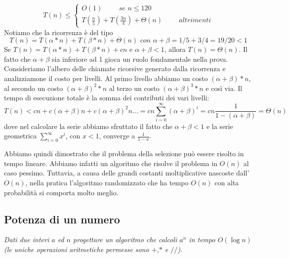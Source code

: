 $$T(n)\leq\begin{cases}
        O(1)\hspace{1cm}\textit{se }n\leq120\\
        T\left(\frac{n}{5}\right)+T\left(\frac{3n}{4}\right)+\Theta(n)\hspace{1cm}\textit{altrimenti}
\end{cases}$$
Notiamo che la ricorrenza è del tipo
\begin{equation*}
    T(n) = T(\alpha * n) + T(\beta * n) + \Theta(n) \textit{ con } \alpha + \beta = 1/5+3/4 = 19/20 < 1
\end{equation*}
Se $T(n) = T(\alpha * n) + T(\beta * n) + cn$ e $\alpha+\beta<1$, allora $T(n)=\Theta(n)$.
Il fatto che $\alpha+\beta$ sia inferiore ad 1 gioca un ruolo fondamentale nella prova. Consideriamo l'albero delle chiamate ricorsive generato dalla ricorrenza e analizziamone il costo per livelli. 
Al primo livello abbiamo un costo $(\alpha+\beta)*n$, al secondo un costo $(\alpha+\beta)^2*n$
al terzo un costo $(\alpha+\beta)^3*n$ e così via. 
Il tempo di esecuzione totale è la somma dei contributi dei vari livelli:
\begin{equation*}
    T(n) < cn+c(\alpha+\beta)n+c(\alpha+\beta)^2n...=cn\sum^\infty_{i=0}(\alpha+\beta)^i=cn\frac{1}{1-(\alpha+\beta)}=\Theta(n)
\end{equation*}
dove nel calcolare la serie abbiamo sfruttato il fatto che $\alpha+\beta<1$ e la serie geometrica $\sum^\infty_{i=0}x^i$, con $x < 1$, converge a $\frac{1}{1-x}$.

Abbiamo quindi dimostrato che il problema della selezione può essere risolto in tempo lineare.
Abbiamo infatti un algoritmo che risolve il problema in $O(n)$ al caso pessimo. Tuttavia, a causa delle grandi costanti moltiplicative nascoste dall'$O(n)$, nella pratica l'algoritmo randomizzato che ha tempo $O(n)$ con alta probabilità si comporta molto meglio.

\subsection{Potenza di un numero}
\textit{Dati due interi $a$ ed $n$ progettare un algoritmo che calcoli $a^n$ in tempo $O(\log n)$ (le uniche operazioni aritmetiche permesse sono $+$,$*$ e $//$).}

